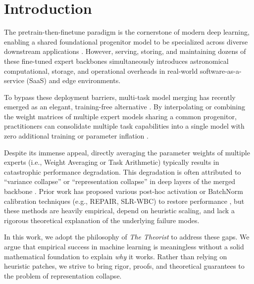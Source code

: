 \documentclass{article}
\theoremstyle{plain}
\theoremstyle{definition}
\theoremstyle{remark}
\begin{document}
\section{Introduction}
\label{submission-intro}
The pretrain-then-finetune paradigm is the cornerstone of modern deep learning, enabling a shared foundational progenitor model to be specialized across diverse downstream applications \cite{vaswani2017attention, de_deng2009imagenet}. However, serving, storing, and maintaining dozens of these fine-tuned expert backbones simultaneously introduces astronomical computational, storage, and operational overheads in real-world software-as-a-service (SaaS) and edge environments. 

To bypass these deployment barriers, multi-task model merging has recently emerged as an elegant, training-free alternative \cite{wortsman2022soups, ilharco2022editing}. By interpolating or combining the weight matrices of multiple expert models sharing a common progenitor, practitioners can consolidate multiple task capabilities into a single model with zero additional training or parameter inflation \cite{choshen2022merging, matena2022merging}. 

Despite its immense appeal, directly averaging the parameter weights of multiple experts (i.e., Weight Averaging or Task Arithmetic) typically results in catastrophic performance degradation. This degradation is often attributed to ``variance collapse'' or ``representation collapse'' in deep layers of the merged backbone \cite{jordan2022repair, stoica2023zipit}. Prior work has proposed various post-hoc activation or BatchNorm calibration techniques (e.g., REPAIR, SLR-WBC) to restore performance \cite{jordan2022repair}, but these methods are heavily empirical, depend on heuristic scaling, and lack a rigorous theoretical explanation of the underlying failure modes.

In this work, we adopt the philosophy of \textit{The Theorist} to address these gaps. We argue that empirical success in machine learning is meaningless without a solid mathematical foundation to explain \textit{why} it works. Rather than relying on heuristic patches, we strive to bring rigor, proofs, and theoretical guarantees to the problem of representation collapse.
\end{document}
